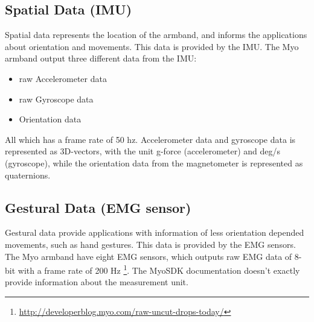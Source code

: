 \subsection{Spatial Data (IMU)}
Spatial data represents the location of the armband, and informs the applications about orientation and movements. This data is provided by the IMU. The Myo armband output three different data from the IMU: 
\begin{itemize}
  \item raw Accelerometer data
  \item raw Gyroscope data
  \item Orientation data
\end{itemize}
All which has a frame rate of 50 hz. Accelerometer data and gyroscope data is represented as 3D-vectors, with the unit g-force (accelerometer) and deg/s (gyroscope), while the orientation data from the magnetometer is represented as quaternions.

\subsection{Gestural Data (EMG sensor)}
Gestural data provide applications with information of less orientation depended movements, such as hand gestures. This data is provided by the EMG sensors. The Myo armband have eight EMG sensors, which outputs raw EMG data of 8-bit with a frame rate of 200 Hz \footnote{\url{http://developerblog.myo.com/raw-uncut-drops-today/}}. The MyoSDK documentation \cite{myoSDK} doesn't exactly provide information about the measurement unit. 
